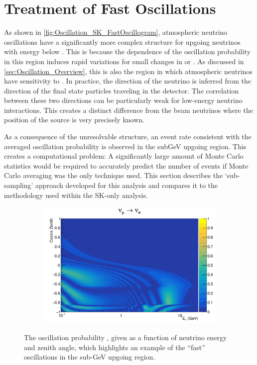 \section{Treatment of Fast Oscillations}
\label{sec:Oscillation_FastOscillations}

As shown in \autoref{fig:Oscillation_SK_FastOscillogram}, atmospheric neutrino oscillations have a significantly more complex structure for upgoing neutrinos with energy below . This is because the  dependence of the oscillation probability in this region induces rapid variations for small changes in  or . As discussed in \autoref{sec:Oscillation_Overview}, this is also the region in which atmospheric neutrinos have sensitivity to . In practice, the direction of the neutrino is inferred from the direction of the final state particles traveling in the detector. The correlation between these two directions can be particularly weak for low-energy neutrino interactions. This creates a distinct difference from the beam neutrinos where the position of the source is very precisely known.

As a consequence of the unresolvable structure, an event rate consistent with the averaged oscillation probability is observed in the subGeV upgoing region. This creates a computational problem: A significantly large amount of Monte Carlo statistics would be required to accurately predict the number of events if Monte Carlo averaging was the only technique used. This section describes the `sub-sampling' approach developed for this analysis and compares it to the methodology used within the SK-only analysis.

\begin{figure}[h]
  \begin{subfigure}[t]{0.8\textwidth}
    \includegraphics[width=\textwidth, trim={0mm 0mm 0mm 0mm}, clip,page=1]{Figures/Oscillation/FastOscillationExample.pdf}
  \end{subfigure}
  \caption{The oscillation probability , given as a function of neutrino energy and zenith angle, which highlights an example of the ``fast'' oscillations in the sub-GeV upgoing region.}
  \label{fig:Oscillation_SK_FastOscillogram}
\end{figure}

